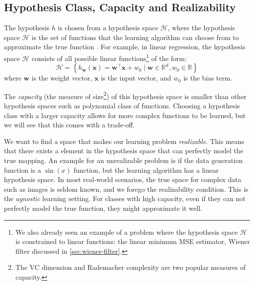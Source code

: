 \subsection{Hypothesis Class, Capacity and Realizability}
The hypothesis $h$ is chosen from a hypothesis space $\mathcal{H}$, where the hypothesis space $\mathcal{H}$ is the set of functions that the learning algorithm can choose from to approximate the true function \cite{tibshiraniElementsStatisticalLearning}.
For example, in linear regression, the hypothesis space $\mathcal{H}$ consists of all possible  linear functions\footnote{We also already seen an example of a problem where the hypothesis space $\mathcal{H}$ is constrained to linear functions: the linear minimum \gls{MSE} estimator, Wiener filter discussed in \cref{sec:wiener-filter}.} of the form:
\begin{equation}\label{eq:linear-hypothesis}
   \mathcal{H} =  \left\{ h_{\mathbf{w}}(\mathbf{x}) = \mathbf{w}^\top \mathbf{x} + w_0 \mid \mathbf{w} \in \mathbb{R}^d, w_0 \in \mathbb{R} \right\}
\end{equation}
where $\mathbf{w}$ is the weight vector, $\mathbf{x}$ is the input vector, and $w_0$ is the bias term. 

The \textit{capacity} (the measure of size\footnote{The VC dimension and Rademacher complexity are two popular measures of capacity.}) of this hypothesis space is smaller than other  hypothesis spaces such as polynomial class of functions. Choosing a hypothesis class with a larger capacity allows for more complex functions to be learned, but we will see that this comes with a trade-off.

We want to find a space that makes our learning problem \textit{realizable}. This means that there exists a element  in the hypothesis space that can perfectly model the true mapping. An example for an unrealizable problem is if the data generation function is a $\sin(x)$ function, but the learning algorithm has a linear hypothesis space. In most real-world scenarios, the true space for complex data such as images is seldom known, and we forego the realizability condition. This is the \textit{agnostic} learning setting. For classes with high capacity, even if they can not perfectly model the true function, they might approximate it well.

